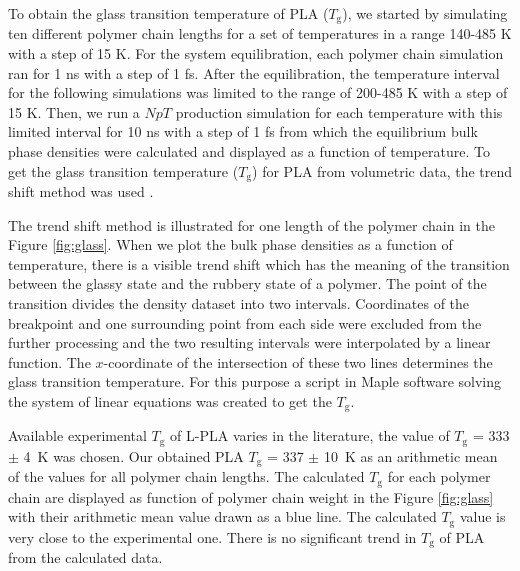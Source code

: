 To obtain the glass transition temperature of PLA ($T_\mathrm{g}$), we started by simulating ten different polymer chain lengths for a set of temperatures in a range 140-485 K with a step of 15 K. For the system equilibration, each polymer chain simulation ran for 1 ns with a step of 1 fs. After the equilibration, the temperature interval for the following simulations was limited to the range of 200-485 K with a step of 15 K. Then, we run a $NpT$ production simulation for each temperature with this limited interval for 10 ns with a step of 1 fs from which the equilibrium bulk phase densities were calculated and displayed as a function of temperature. To get the glass transition temperature ($T_\mathrm{g}$) for PLA from volumetric data, the trend shift method was used \cite{klajmon_does_2022}. 

The trend shift method is illustrated for one length of the polymer chain in the Figure \ref{fig:glass}. When we plot the bulk phase densities as a function of temperature, there is a visible trend shift which has the meaning of the transition between the glassy state and the rubbery state of a polymer. The point of the transition divides the density dataset into two intervals. Coordinates of the breakpoint and one surrounding point from each side were excluded from the further processing and the two resulting intervals were interpolated by a linear function. The $x$-coordinate of the intersection of these two lines determines the glass transition temperature. For this purpose a script in Maple software solving the system of linear equations was created to get the $T_\mathrm{g}$.

Available experimental $T_\mathrm{g}$ of L-PLA varies in the literature, the value  of $T_\mathrm{g}$ = 333 $\pm$ 4~K \cite{pyda_reversing_2005} was chosen. Our obtained PLA $T_\mathrm{g}$ = 337 $\pm$ 10~K as an arithmetic mean of the values for all polymer chain lengths. The calculated $T_\mathrm{g}$ for each polymer chain are displayed as function of polymer chain weight in the Figure \ref{fig:glass} with their arithmetic mean value drawn as a blue line. The calculated $T_\mathrm{g}$ value is very close to the experimental one. There is no significant trend in $T_\mathrm{g}$ of PLA from the calculated data. 


